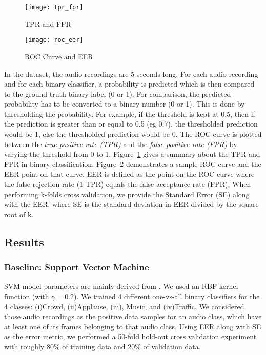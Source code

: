 \begin{figure}[!htb] 
\centering 
\texttt{[image: tpr\_fpr]} 
\caption[TPR-FPR]{TPR and FPR}
\label{fig:tpr_fpr} 
\end{figure}

\begin{figure}[!htb] 
\centering 
\texttt{[image: roc\_eer]} 
\caption[ROC-EER]{ROC Curve and EER}
\label{fig:roc_eer} 
\end{figure}

In the dataset, the audio recordings are 5 seconds long. For each audio recording and for each binary classifier, a probability is predicted which is then compared to the ground truth binary label (0 or 1). For comparison, the predicted probability has to be converted to a binary number (0 or 1). This is done by thresholding the probability. For example, if the threshold is kept at 0.5, then if the prediction is greater than or equal to 0.5 (eg 0.7), the thresholded prediction would be 1, else the thresholded prediction would be 0. The ROC curve is plotted between the \textsl{true positive rate (TPR)} and the \textsl{false positive rate (FPR)} by varying the threshold from 0 to 1. Figure~\ref{fig:tpr_fpr} gives a summary about the TPR and FPR in binary classification. Figure~\ref{fig:roc_eer} demonstrates a sample ROC curve and the EER point on that curve. EER is defined as the point on the ROC curve where the false rejection rate (1-TPR) equals the false acceptance rate (FPR). When performing k-folds cross validation, we provide the Standard Error (SE) along with the EER, where SE is the standard deviation in EER divided by the square root of k.

\subsection{Results}

\subsubsection{Baseline: Support Vector Machine}
SVM model parameters are mainly derived from \cite{kons2013audio}. We used an RBF kernel function (with $\gamma=0.2$). We trained 4 different one-vs-all binary classifiers for the 4 classes: (i)Crowd, (ii)Applause, (iii), Music, and (iv)Traffic. We considered those audio recordings as the positive data samples for an audio class, which have at least one of its frames belonging to that audio class. Using EER along with SE as the error metric, we performed a 50-fold hold-out cross validation experiment with roughly 80\% of training data and 20\% of validation data. 

